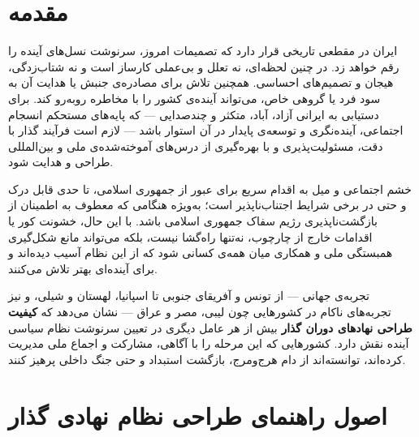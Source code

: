 \mainmatter
\pagestyle{fancy}

\chapter{مقدمه}
\label{ch:intro}

ایران در مقطعی تاریخی قرار دارد که تصمیمات امروز، سرنوشت نسل‌های آینده را رقم خواهد زد. در چنین لحظه‌ای، نه تعلل و بی‌عملی کارساز است و نه شتاب‌زدگی، هیجان و تصمیم‌های احساسی. همچنین تلاش برای مصادره‌ی جنبش یا هدایت آن به سود فرد یا گروهی خاص، می‌تواند آینده‌ی کشور را با مخاطره روبه‌رو کند.
برای دستیابی به ایرانی آزاد، آباد، متکثر و چندصدایی — که پایه‌های مستحکم انسجام اجتماعی، آینده‌نگری و توسعه‌ی پایدار در آن استوار باشد — لازم است فرآیند گذار با دقت، مسئولیت‌پذیری و با بهره‌گیری از درس‌های آموخته‌شده‌ی ملی و بین‌المللی طراحی و هدایت شود.

خشم اجتماعی و میل به اقدام سریع برای عبور از جمهوری اسلامی، تا حدی قابل درک و حتی در برخی شرایط اجتناب‌ناپذیر است؛ به‌ویژه هنگامی که معطوف به اطمینان از بازگشت‌ناپذیری رژیم سفاک جمهوری اسلامی باشد. با این حال، خشونت کور یا اقدامات خارج از چارچوب، نه‌تنها راه‌گشا نیست، بلکه می‌تواند مانع شکل‌گیری همبستگی ملی و همکاری میان همه‌‌ی کسانی شود که از این نظام آسیب دیده‌اند و برای آینده‌ای بهتر تلاش می‌کنند.


\begin{summarybox}
تجربه‌ی جهانی — از تونس و آفریقای جنوبی تا اسپانیا، لهستان و شیلی، و نیز تجربه‌های ناکام در کشورهایی چون لیبی، مصر و عراق — نشان می‌دهد که 	\textbf{کیفیت طراحی نهادهای دوران گذار}  بیش از هر عامل دیگری در تعیین سرنوشت نظام سیاسی آینده نقش دارد. کشورهایی که این مرحله را با آگاهی، مشارکت و اجماع ملی مدیریت کرده‌اند، توانسته‌اند از دام هرج‌ومرج، بازگشت استبداد و حتی جنگ داخلی پرهیز کنند.
\end{summarybox}

\chapter{اصول راهنمای طراحی نظام نهادی گذار}
\label{ch:principles}

